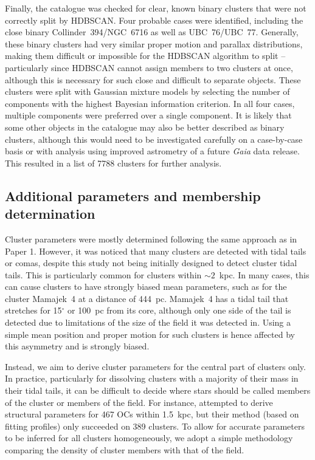 Finally, the catalogue was checked for clear, known binary clusters that were not correctly split by HDBSCAN. Four probable cases were identified, including the close binary Collinder~394/NGC~6716 as well as UBC~76/UBC~77. Generally, these binary clusters had very similar proper motion and parallax distributions, making them difficult or impossible for the HDBSCAN algorithm to split -- particularly since HDBSCAN cannot assign members to two clusters at once, although this is necessary for such close and difficult to separate objects. These clusters were split with Gaussian mixture models by selecting the number of components with the highest Bayesian information criterion. In all four cases, multiple components were preferred over a single component. It is likely that some other objects in the catalogue may also be better described as binary clusters, although this would need to be investigated carefully on a case-by-case basis \citep[see e.g.][]{kovaleva_collinder_2020, anders_ngc_2022-1} or with analysis using improved astrometry of a future \emph{Gaia} data release. This resulted in a list of 7788 clusters for further analysis.




\subsection{Additional parameters and membership determination}\label{c3:sec:clustering:parameters}

Cluster parameters were mostly determined following the same approach as in Paper 1. However, it was noticed that many clusters are detected with tidal tails or comas, despite this study not being initially designed to detect cluster tidal tails. This is particularly common for clusters within $\sim2$~kpc. In many cases, this can cause clusters to have strongly biased mean parameters, such as for the cluster Mamajek~4 at a distance of 444~pc. Mamajek~4 has a tidal tail that stretches for 15$^\circ$ or 100~pc from its core, although only one side of the tail is detected due to limitations of the size of the field it was detected in. Using a simple mean position and proper motion for such clusters is hence affected by this asymmetry and is strongly biased. 

Instead, we aim to derive cluster parameters for the central part of clusters only. In practice, particularly for dissolving clusters with a majority of their mass in their tidal tails, it can be difficult to decide where stars should be called members of the cluster or members of the field. For instance, \cite{tarricq_structural_2022} attempted to derive structural parameters for 467 OCs within 1.5~kpc, but their method (based on fitting \cite{king_structure_star_1962} profiles) only succeeded on 389 clusters. To allow for accurate parameters to be inferred for all clusters homogeneously, we adopt a simple methodology comparing the density of cluster members with that of the field.

